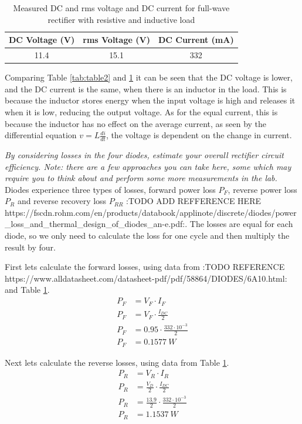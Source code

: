 \documentclass[12pt,a4paper]{article}
\begin{document}
\begin{table}[H]
\caption{Measured DC and rms voltage and DC current for full-wave rectifier with resistive and inductive load \label{tab:table3}}
\centering
\begin{tabular}{|c|c|c|}
\hline
DC Voltage (V) & rms Voltage (V) & DC Current (mA)\\
\hline
11.4 & 15.1 & 332\\
\hline
\end{tabular}
\end{table}

Comparing Table \ref{tab:table2} and \ref{tab:table3} it can be seen that the DC voltage is lower, and the DC current is the same, when there is an inductor in the load. This is because the inductor stores energy when the input voltage is high and releases it when it is low, reducing the output voltage. As for the equal current, this is because the inductor has no effect on the average current, as seen by the differential equation $v = L \frac{di}{dt}$, the voltage is dependent on the change in current.

\textit{By considering losses in the four diodes, estimate your overall rectifier circuit efficiency. Note: there
are a few approaches you can take here, some which may require you to think about and perform
some more measurements in the lab.}\\

Diodes experience three types of losses, forward power loss \(P_F\), reverse power loss \(P_R\) and reverse recovery loss \(P_{RR}\) :TODO ADD REFFERENCE HERE https://fscdn.rohm.com/en/products/databook/applinote/discrete/diodes/power_loss_and_thermal_design_of_diodes_an-e.pdf:. The losses are equal for each diode, so we only need to calculate the loss for one cycle and then multiply the result by four.

First lets calculate the forward losses, using data from :TODO REFERENCE https://www.alldatasheet.com/datasheet-pdf/pdf/58864/DIODES/6A10.html: and Table \ref{tab:table3}.
\begin{align*}
P_F &= V_F\cdot I_F \\
P_F &= V_F\cdot \frac{I_{DC}}{2} \\
P_F &= 0.95\cdot \frac{332\cdot 10^{-3}}{2} \\
P_F &= 0.1577\ W
\end{align*}

Next lets calculate the reverse losses, using data from Table \ref{tab:table3}.
\begin{align*}
P_R &= V_R\cdot I_R \\
P_R &= \frac{V_D}{2}\cdot \frac{I_{DC}}{2} \\
P_R &= \frac{13.9}{2}\cdot \frac{332\cdot 10^{-3}}{2} \\
P_R &= 1.1537\ W
\end{align*}
\end{document}
